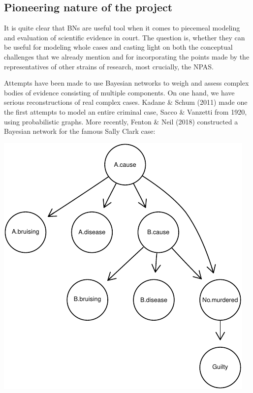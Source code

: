 \documentclass[11pt,dvipsnames,enabledeprecatedfontcommands]{scrartcl}
\begin{document}

\hypertarget{pioneering-nature-of-the-project}{%
\subsection{Pioneering nature of the
project}\label{pioneering-nature-of-the-project}}

It is quite clear that BNs are useful tool when it comes to piecemeal
modeling and evaluation of scientific evidence in court. The question
is, whether they can be useful for modeling whole cases and casting
light on both the conceptual challenges that we already mention and for
incorporating the points made by the representatives of other strains of
research, most crucially, the NPAS.

Attempts have been made to use Bayesian networks to weigh and assess
complex bodies of evidence consisting of multiple components. On one
hand, we have serious reconstructions of real complex cases. Kadane \&
Schum (2011) made one the first attempts to model an entire criminal
case, Sacco \& Vanzetti from 1920, using probabilistic graphs. More
recently, Fenton \& Neil (2018) constructed a Bayesian network for the
famous Sally Clark case:

\begin{center}\includegraphics{BNfiles/unnamed-chunk-11-1} \end{center}
\end{document}
